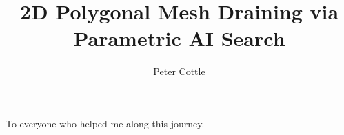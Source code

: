 \documentclass[masters]{ucbthesis}
\begin{document}

\title{2D Polygonal Mesh Draining via Parametric AI Search}
\author{Peter Cottle}


\maketitle
\approvalpage
\copyrightpage



\begin{frontmatter}



\tableofcontents
\clearpage
\listoffigures
\clearpage
\listoftables

\begin{acknowledgements}
\begin{center}
To everyone who helped me along this journey.
\end{center}
\end{acknowledgements}

\end{frontmatter}

\pagestyle{headings}










\printbibliography
\end{document}
